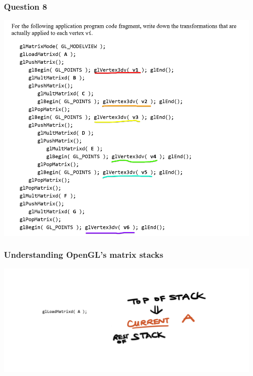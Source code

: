 \documentclass{beamer}
\begin{document}
\begin{frame}
    \frametitle{Question 8}

    \begin{center}
        \includegraphics[scale=0.5]{q8.png}
    \end{center}

\end{frame}

\begin{frame}
    \frametitle{Understanding OpenGL's matrix stacks}

    \begin{center}
        \includegraphics[scale=0.4]{q8-1.png}
    \end{center}

\end{frame}
\end{document}
